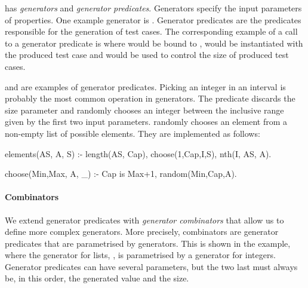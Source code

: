 \plqc{} has {\it generators} and {\it generator
predicates}.
%
Generators specify the input parameters of properties.
%
One example generator is .
%
Generator predicates are the predicates responsible for the generation
of test cases.
%
The corresponding example of a call to a generator predicate is  where  would be bound to ,
 would be instantiated with the produced test case and
 would be used to control the size of produced test cases.
%


%

   and  are examples of generator
predicates.
%
Picking an integer in an interval is probably the most common operation
in generators.
%
The  predicate discards the size parameter and randomly
chooses an integer between the inclusive range given by the first two
input parameters.
%
  randomly chooses an element
from a non-empty list of possible elements.
%
They are implemented as follows:
\begin{yapcode}
 elements(AS, A, S) :-
   length(AS, Cap), choose(1,Cap,I,S), nth(I, AS, A).

 choose(Min,Max, A, _) :- Cap is Max+1, random(Min,Cap,A).
\end{yapcode}


\paragraph{\bf Combinators}

We extend generator predicates with \emph{generator combinators} that
allow us to define more complex generators.
%
More precisely, combinators are generator predicates that are parametrised by
generators.
%
This is shown in the  example, where the generator for lists,
, is parametrised by a generator for integers.
%
Generator predicates can have several parameters, but the two last
must always be, in this order, the generated value and the size.
%


